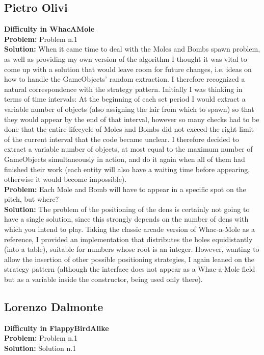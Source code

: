 \documentclass[a4paper,12pt]{report}
\begin{document}
\subsection*{Pietro Olivi}
\textbf{Difficulty in WhacAMole}\\
\textbf{Problem:} Problem n.1\\
\textbf{Solution:} When it came time to deal with the Moles and Bombs spawn problem, as well as providing my own version of the algorithm
I thought it was vital to come up with a solution that would leave room for future changes, i.e. ideas on how to handle the GameObjects’
random extraction. I therefore recognized a natural correspondence with the strategy pattern. Initially I was thinking in terms of time
intervals: At the beginning of each set period I would extract a variable number of objects (also assigning the lair from which to spawn)
so that they would appear by the end of that interval, however so many checks had to be done that the entire lifecycle of Moles and Bombs
did not exceed the right limit of the current interval that the code became unclear.  I therefore decided to extract a variable number of
objects, at most equal to the maximum number of GameObjects simultaneously in action, and do it again when all of them had finished their
work (each entity will also have a waiting time before appearing, otherwise it would become impossible).
\pagebreak\\
\textbf{Problem:} Each Mole and Bomb will have to appear in a specific spot on the
pitch, but where?  \\
\textbf{Solution:} The problem of the positioning of the dens is certainly not going to have a single solution, since this strongly depends
on the number of dens with which you intend to play. Taking the classic arcade version of Whac-a-Mole as a reference, I provided an
implementation that distributes the holes equidistantly (into a table), suitable for numbers whose root is an integer. However, wanting to
allow the insertion of other possible positioning strategies, I again leaned on the strategy pattern (although the interface does not appear
as a Whac-a-Mole field but as a variable inside the constructor, being used only there).
\pagebreak

\subsection*{Lorenzo Dalmonte}
\textbf{Difficulty in FlappyBirdAlike}\\
\textbf{Problem:} Problem n.1\\
\textbf{Solution:} Solution n.1
\end{document}
